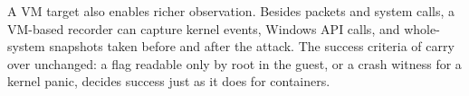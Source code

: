 A VM target also enables richer observation. Besides packets and system
calls, a VM-based recorder can capture kernel events, Windows API calls, and
whole-system snapshots taken before and after the attack. The success
criteria of \cvexthree carry over unchanged: a flag readable only by root in
the guest, or a crash witness for a kernel panic, decides success just as it
does for containers.
